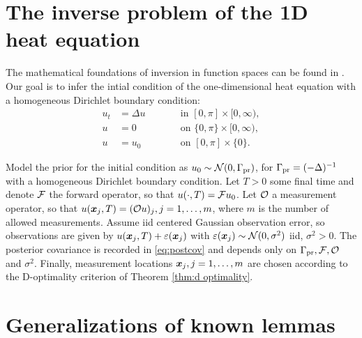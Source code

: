\appendix
\section{The inverse problem of the 1D heat equation}\label{section:example}
The mathematical foundations of inversion in function spaces can be
found in \cite{Stuart10}. Our goal is to infer the intial condition of
the one-dimensional heat equation with a homogeneous Dirichlet
boundary condition:
\begin{subequations}\label{eq:heat equation}
  \begin{alignat}{2}
    u_t &= \Delta u &&\qquad \text{in } [0,\pi] \times [0,\infty),\\
      u &= 0 &&\qquad \text{on } \{0, \pi\} \times [0,\infty),\\
        u &= u_0 &&\qquad \text{on }[0,\pi] \times \{0\}.
  \end{alignat}
\end{subequations}

Model the prior for the initial condition as $u_0 \sim
\mathcal{N}(0,\Gamma_{\textup{pr}})$, for $\Gamma_{\textup{pr}} = (-\Delta)^{-1}$ with a homogeneous
Dirichlet boundary condition. Let $T > 0$ some final time and denote
$\mathcal{F}$ the forward operator, so that $u(\cdot, T) = \mathcal{F} u_0$. Let
$\mathcal{O}$ a measurement operator, so that $u({\boldsymbol{x}}_j,T) = (\mathcal{O} u)_j,
j=1,\dots,m$, where $m$ is the number of allowed measurements. Assume
iid centered Gaussian observation error, so observations are given by
$u({\boldsymbol{x}}_j,T) + \varepsilon({\boldsymbol{x}}_j)$ with $\varepsilon({\boldsymbol{x}}_j) \sim \mathcal{N}(0, \sigma^2)$
iid, $\sigma^2 > 0$. The posterior covariance is recorded
in \eqref{eq:postcov} and depends only on $\Gamma_{\textup{pr}}, \mathcal{F}, \mathcal{O}$ and
$\sigma^2$. Finally, measurement locations ${\boldsymbol{x}}_j,j=1,\dots,m$ are
chosen according to the D-optimality criterion of Theorem \ref{thm:d
optimality}.


\section{Generalizations of known lemmas}

